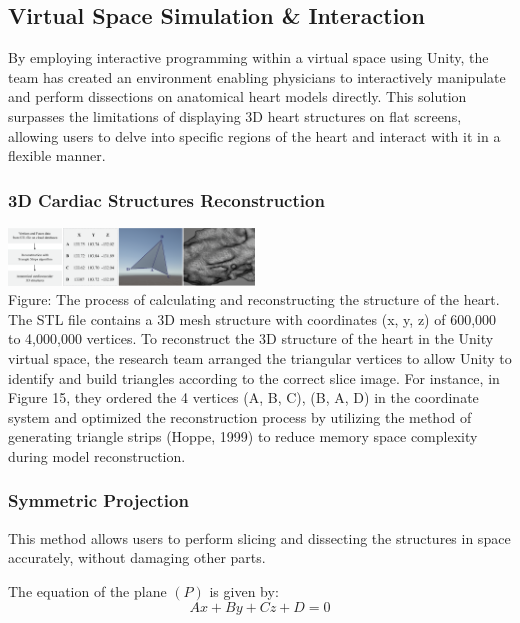 \documentclass{article}
\begin{document}
\begin{multicols}{2}
\subsection{Virtual Space Simulation \& Interaction}
By employing interactive programming within a virtual space using Unity, the team has created an environment enabling physicians to interactively manipulate and perform dissections on anatomical heart models directly. This solution surpasses the limitations of displaying 3D heart structures on flat screens, allowing users to delve into specific regions of the heart and interact with it in a flexible manner.

\subsubsection{3D Cardiac Structures Reconstruction}
\includegraphics[width=0.49\textwidth]{figures/strip.png} \\
Figure: The process of calculating and reconstructing the structure of the heart. \\

The STL file contains a 3D mesh structure with coordinates (x, y, z) of 600,000 to 4,000,000 vertices. To reconstruct the 3D structure of the heart in the Unity virtual space, the research team arranged the triangular vertices to allow Unity to identify and build triangles according to the correct slice image. For instance, in Figure 15, they ordered the 4 vertices (A, B, C), (B, A, D) in the coordinate system and optimized the reconstruction process by utilizing the method of generating triangle strips (Hoppe, 1999) to reduce memory space complexity during model reconstruction.



\subsubsection{Symmetric Projection}

This method allows users to perform slicing and dissecting the structures in space accurately, without damaging other parts.

The equation of the plane $ (P) $ is given by:
$$ Ax + By + Cz + D = 0 $$


\end{multicols}
\end{document}
